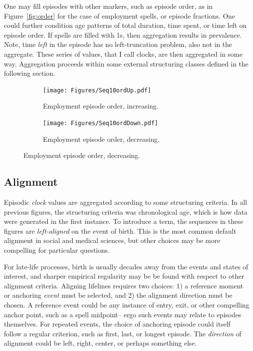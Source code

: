\documentclass{article}
\begin{document}
One may fill episodes with other markers, such as episode
order, as in Figure~\ref{fig:order} for the case of employment spells, or
episode fractions. One could further condition age patterns of total duration, time spent, or time left on episode order. If spells are
filled with 1s, then aggregation results in prevalence. Note, time \emph{left}
in the episode has no left-truncation problem, also not in the aggregate. 
These series of values, that I call clocks, are then aggregated in some
way. Aggregation proceeds within some external structuring classes defined in
the following section.

\begin{figure}[ht!]
\centering
\caption{Employment episodes from Figure~\ref{fig:seq10}
are imputed with order count variables.}
\label{fig:order}

\begin{subfigure}{\textwidth}
\caption{Employment episode order, increasing.}
\label{fig:orderup}
\texttt{[image: Figures/Seq10ordUp.pdf]}
\end{subfigure}

\begin{subfigure}{\textwidth}
\caption{Employment episode order, decreasing.}
\label{fig:orderdown}
\texttt{[image: Figures/Seq10ordDown.pdf]}
\end{subfigure}

\end{figure}


\FloatBarrier
\subsection{Alignment}
\label{sec:align}
Episodic \emph{clock} values are aggregated according to some
structuring criteria. In all previous figures, the structuring criteria was
chronological age, which is how data were generated in the first instance. To
introduce a term, the sequences in these figures are \emph{left-aligned} on the
event of birth.
This is the most common default alignment in social and medical sciences, but other choices may be more
compelling for particular questions.

For late-life processes, birth is usually decades away from the events and
states of interest, and sharper empirical regularity may be be found with
respect to other alignment criteria. Aligning lifelines requires two choices: 1) a reference moment or anchoring \emph{event} must be selected,
and 2) the alignment direction must be chosen. A reference event could be any instance of
entry, exit, or other compelling anchor point, such as a spell midpoint-- ergo
such events may relate to episodes themselves.
For repeated events, the choice of anchoring episode could itself follow a
regular criterion, such as first, last, or longest episode. The \emph{direction} of
alignment could be left, right, center, or perhaps something else.
\end{document}
